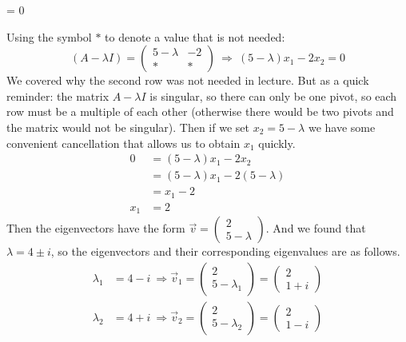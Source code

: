 \begin{parts}
        \ifnum \Solutions = 0 
            \vspace{2cm}
        \else
            {\color{DarkBlue} Using the symbol $\ast$ to denote a value that is not needed:
            $$(A-\lambda I) = \begin{pmatrix} 5-\lambda & -2 \\ \ast & \ast\end{pmatrix} \ \Rightarrow \ (5-\lambda)x_1 - 2x_2 = 0$$
            We covered why the second row was not needed in lecture. But as a quick reminder: the matrix $A - \lambda I$ is singular, so there can only be one pivot, so each row must be a multiple of each other (otherwise there would be two pivots and the matrix would not be singular). Then if we set $x_2 = 5 - \lambda$ we have some convenient cancellation that allows us to obtain $x_1$ quickly. 
            \begin{align}
                0 
                &= (5-\lambda)x_1 - 2x_2 \\ 
                &= (5-\lambda)x_1 - 2(5 - \lambda) \\ 
                &= x_1 - 2 \\ 
                x_1 &= 2
            \end{align}
            Then the eigenvectors have the form $\vec v = \begin{pmatrix} 2\\5 - \lambda \end{pmatrix}$. And we found that $\lambda = 4 \pm  i$, so the eigenvectors and their corresponding eigenvalues are as follows.  
            \begin{align}
                \lambda_1 &= 4-i \ \Rightarrow \vec v_1 = \begin{pmatrix} 2\\5 - \lambda_1 \end{pmatrix} = \begin{pmatrix} 2\\1+i \end{pmatrix} \\
                \lambda_2 &= 4+i \ \Rightarrow \vec v_2 = \begin{pmatrix} 2\\5-\lambda_2 \end{pmatrix} = \begin{pmatrix} 2\\1-i\end{pmatrix}
            \end{align}
            
}
\end{parts}
